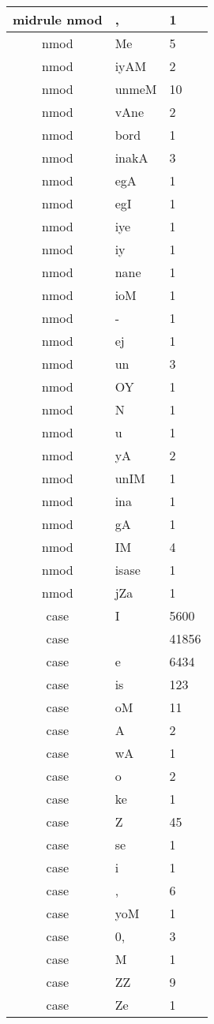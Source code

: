 \documentclass[a4 paper]{article}
\begin{document}
\begin{longtable}{cp{}p{}}
midrule nmod & , & 1\\ \midrule nmod & Me & 5\\ \midrule nmod & iyAM & 2\\ \midrule nmod & unmeM & 10\\ \midrule nmod & vAne & 2\\ \midrule nmod & bord & 1\\ \midrule nmod & inakA & 3\\ \midrule nmod & egA & 1\\ \midrule nmod & egI & 1\\ \midrule nmod & iye & 1\\ \midrule nmod & iy & 1\\ \midrule nmod & nane & 1\\ \midrule nmod & ioM & 1\\ \midrule nmod & - & 1\\ \midrule nmod & ej & 1\\ \midrule nmod & un & 3\\ \midrule nmod & OY & 1\\ \midrule nmod & N & 1\\ \midrule nmod & u & 1\\ \midrule nmod & yA & 2\\ \midrule nmod & unIM & 1\\ \midrule nmod & ina & 1\\ \midrule nmod & gA & 1\\ \midrule nmod & IM & 4\\ \midrule nmod & isase & 1\\ \midrule nmod & jZa & 1\\ \midrule 
case & I & 5600\\ \midrule case &  & 41856\\ \midrule case & e & 6434\\ \midrule case & is & 123\\ \midrule case & oM & 11\\ \midrule case & A & 2\\ \midrule case & wA & 1\\ \midrule case & o & 2\\ \midrule case & ke & 1\\ \midrule case & Z & 45\\ \midrule case & se & 1\\ \midrule case & i & 1\\ \midrule case & , & 6\\ \midrule case & yoM & 1\\ \midrule case & 0, & 3\\ \midrule case & M & 1\\ \midrule case & ZZ & 9\\ \midrule case & Ze & 1\\ \midrule 

\end{longtable}
\end{document}
